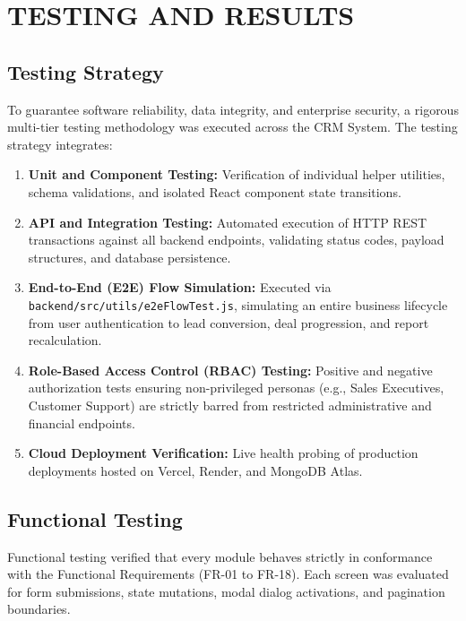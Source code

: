 \chapter{TESTING AND RESULTS}

\section{Testing Strategy}
To guarantee software reliability, data integrity, and enterprise security, a rigorous multi-tier testing methodology was executed across the CRM System. The testing strategy integrates:
\begin{enumerate}
    \item \textbf{Unit and Component Testing:} Verification of individual helper utilities, schema validations, and isolated React component state transitions.
    \item \textbf{API and Integration Testing:} Automated execution of HTTP REST transactions against all backend endpoints, validating status codes, payload structures, and database persistence.
    \item \textbf{End-to-End (E2E) Flow Simulation:} Executed via \texttt{backend/src/utils/e2eFlowTest.js}, simulating an entire business lifecycle from user authentication to lead conversion, deal progression, and report recalculation.
    \item \textbf{Role-Based Access Control (RBAC) Testing:} Positive and negative authorization tests ensuring non-privileged personas (e.g., Sales Executives, Customer Support) are strictly barred from restricted administrative and financial endpoints.
    \item \textbf{Cloud Deployment Verification:} Live health probing of production deployments hosted on Vercel, Render, and MongoDB Atlas.
\end{enumerate}

\section{Functional Testing}
Functional testing verified that every module behaves strictly in conformance with the Functional Requirements (FR-01 to FR-18). Each screen was evaluated for form submissions, state mutations, modal dialog activations, and pagination boundaries.

